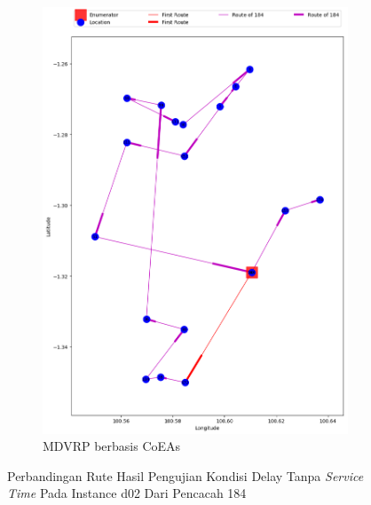 \begin{figure}[H]
	\centering
	\begin{subfigure}[t]{\textwidth}
		\centering
		\includegraphics[width=\textwidth]{Resources/Images/delayed_2/real_m15_n100_delayed_2_184_coes}
		\caption{MDVRP berbasis CoEAs}
		\label{fig:real_m15_n100_delayed_2_184_coes}
	\end{subfigure}
	\caption{Perbandingan Rute Hasil Pengujian Kondisi Delay Tanpa \textit{Service Time} Pada Instance d02 Dari Pencacah 184}
	\label{fig:real_m15_n100_delayed_2_184}
\end{figure}


